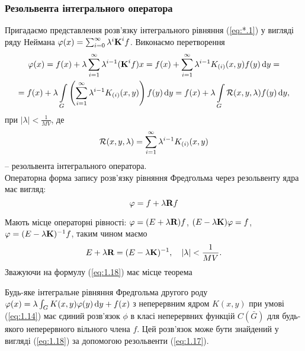 \subsubsection{Резольвента інтегрального оператора}

Пригадаємо представлення розв’язку інтегрального рівняння (\ref{eq:*.1}) у вигляді ряду Неймана $\phi(x) = \sum_{i = 0}^\infty \lambda^i \bf{K}^i f$. Виконаємо перетворення
\begin{multline*}
	\phi(x) = f(x) + \lambda \Sum_{i = 1}^\infty \lambda^{i - 1} (\bf{K}^i f) x = f(x) + \Sum_{i = 1}^\infty \lambda^{i - 1} K_{(i)} (x, y) f(y) \diff y = \\
	= f(x) + \lambda \Int_G \left( \Sum_{i = 1}^\infty \lambda^{i - 1} K_{(i)} (x, y) \right) f(y) \diff y = f(x) + \lambda \Int_G \mathcal{R}(x, y, \lambda) f(y) \diff y,
\end{multline*}
при $|\lambda| < \frac{1}{MV}$, де
\begin{equation}
	\label{eq:1.17}
	\mathcal{R}(x, y, \lambda) = \Sum_{i = 1}^\infty \lambda^{i - 1} K_{(i)} (x, y)
\end{equation}
-- резольвента інтегрального оператора. \\

Операторна форма запису розв’язку рівняння Фредгольма через резольвенту ядра має вигляд:
\begin{equation}
	\label{eq:1.18}
	\phi = f + \lambda \bf{R} f
\end{equation}

Мають місце операторні рівності: $\phi = (E + \lambda \bf{R})f$, $(E - \lambda \bf{K})\phi = f$, $\phi = (E - \lambda \bf{K})^{-1}f$, таким чином маємо
\begin{equation}
	\label{eq:1.19}
	E + \lambda \bf{R} = (E - \lambda \bf{K})^{-1}, \quad |\lambda| < \dfrac{1}{MV}.
\end{equation}
Зважуючи на формулу (\ref{eq:1.18}) має місце теорема
\begin{theorem}
	Будь-яке інтегральне рівняння Фредгольма другого роду $\phi(x) = \lambda \int_G K(x, y) \phi(y) \diff y + f(x)$ з неперервним ядром $K(x, y)$ при умові (\ref{eq:1.14}) має єдиний розв’язок $\phi$ в класі неперервних функцій $C(\bar G)$ для будь-якого неперервного вільного члена $f$. Цей розв’язок може бути знайдений у вигляді (\ref{eq:1.18}) за допомогою резольвенти (\ref{eq:1.17}).
\end{theorem}

